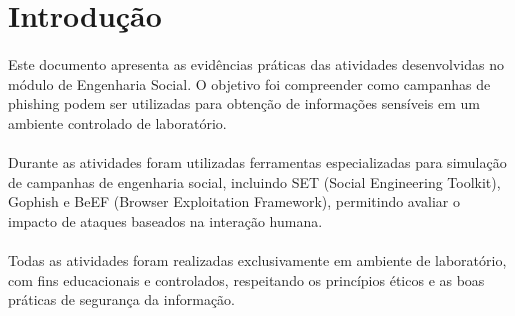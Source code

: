 \section{Introdução}

\paragraph{}
Este documento apresenta as evidências práticas das atividades desenvolvidas no
módulo de Engenharia Social. O objetivo foi compreender como campanhas de
phishing podem ser utilizadas para obtenção de informações sensíveis em um
ambiente controlado de laboratório.

\paragraph{}
Durante as atividades foram utilizadas ferramentas especializadas para
simulação de campanhas de engenharia social, incluindo SET (Social Engineering
Toolkit), Gophish e BeEF (Browser Exploitation Framework), permitindo avaliar o
impacto de ataques baseados na interação humana.

\paragraph{}
Todas as atividades foram realizadas exclusivamente em ambiente de laboratório,
com fins educacionais e controlados, respeitando os princípios éticos e as boas
práticas de segurança da informação.

